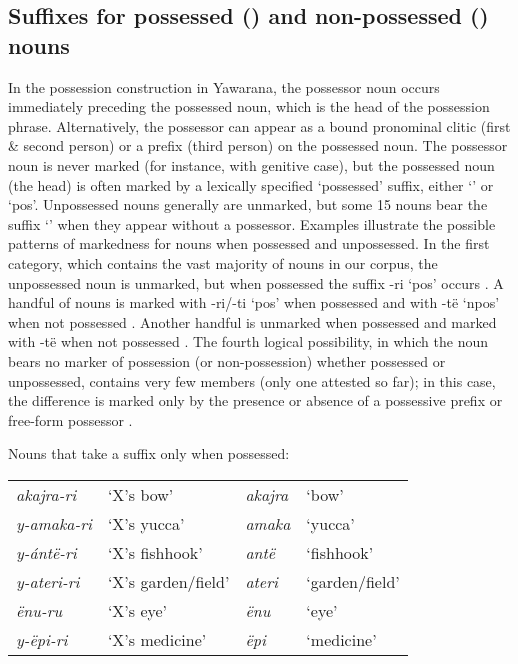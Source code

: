 \documentclass{memoir}
\begin{document}
\subsection{\texorpdfstring{Suffixes for possessed () and
non-possessed () nouns
\label{sec:nounposssuf}}{Suffixes for possessed () and non-possessed () nouns }}

In the possession construction in Yawarana, the possessor noun occurs
immediately preceding the possessed noun, which is the head of the
possession phrase. Alternatively, the possessor can appear as a bound
pronominal clitic (first \& second person) or a prefix (third person) on
the possessed noun. The possessor noun is never marked (for instance,
with genitive case), but the possessed noun (the head) is often marked
by a lexically specified `possessed' suffix, either 
`' or  `pos'. Unpossessed nouns generally are
unmarked, but some 15 nouns bear the suffix  `' when
they appear without a possessor. Examples
 illustrate the possible
patterns of markedness for nouns when possessed and unpossessed. In the
first category, which contains the vast majority of nouns in our corpus,
the unpossessed noun is unmarked, but when possessed the suffix -ri
`pos' occurs . A handful of nouns is marked with
-ri/-ti `pos' when possessed and with -të `npos' when not possessed
. Another handful is unmarked when possessed and
marked with -të when not possessed . The fourth
logical possibility, in which the noun bears no marker of possession (or
non-possession) whether possessed or unpossessed, contains very few
members (only one attested so far); in this case, the difference is
marked only by the presence or absence of a possessive prefix or
free-form possessor .

\ex\label{onlypossessed} Nouns that take a suffix only when possessed:

\begin{tabular}[t]{llll}

 \emph{akajra-ri} &          ‘X’s bow’ & \emph{akajra} &          ‘bow’ \\

\emph{y-amaka-ri} &        ‘X’s yucca’ &  \emph{amaka} &        ‘yucca’ \\
 \emph{y-ántë-ri} &     ‘X’s fishhook’ &   \emph{antë} &     ‘fishhook’ \\
\emph{y-ateri-ri} & ‘X’s garden/field’ &  \emph{ateri} & ‘garden/field’ \\
    \emph{ënu-ru} &          ‘X’s eye’ &    \emph{ënu} &          ‘eye’ \\
  \emph{y-ëpi-ri} &     ‘X’s medicine’ &    \emph{ëpi} &     ‘medicine’ \\

\end{tabular}
 \xe
\end{document}
